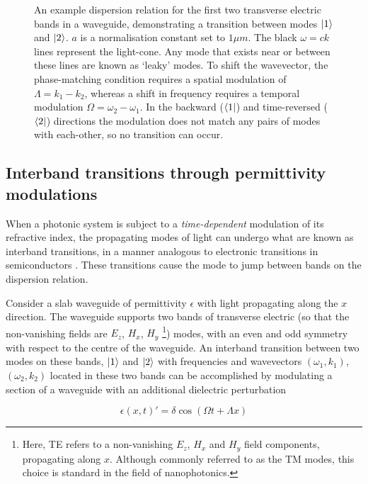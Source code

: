\begin{figure}[t]
	\centering
	\setlength{\figH}{\textwidth}
	\setlength{\figW}{\textwidth}
	
	\caption[Dispersion relation for the first two transverse electric bands in a waveguide]{An example dispersion relation for the first two transverse electric bands in a waveguide, demonstrating a transition between modes $\ket{1}$ and $\ket{2}$. $a$ is a normalisation constant set to $1 \mu m$. The black $\omega = ck$ lines represent the light-cone. Any mode that exists near or between these lines are known as `leaky' modes. To shift the wavevector, the phase-matching condition requires a spatial modulation of $\Lambda = k_1 - k_2$, whereas a shift in frequency requires a temporal modulation $\Omega = \omega_2-\omega_1$. In the backward ($\bra{1}$) and time-reversed ($\bra{2}$) directions the modulation does not match any pairs of modes with each-other, so no transition can occur.}
	\label{fig:bandsample}
\end{figure} 

\subsection{Interband transitions through permittivity modulations}
When a photonic system is subject to a \textit{time-dependent} modulation of its refractive index, the propagating modes of light can undergo what are known as interband transitions, in a manner analogous to electronic transitions in semiconductors \cite{Winn1999}. These transitions cause the mode to jump between bands on the dispersion relation. 

Consider a slab waveguide of permittivity $\epsilon$ with light propagating along the $x$ direction. The waveguide supports two bands of transverse electric (so that the non-vanishing fields are $E_z$, $H_x$, $H_y$ \footnote{Here, TE refers to a non-vanishing $E_z$, $H_x$ and $H_y$ field components, propagating along $x$. Although commonly referred to as the TM modes, this choice is standard in the field of nanophotonics.}) modes, with an even and odd symmetry with respect to the centre of the waveguide. An interband transition between two modes on these bands, $\ket{1}$ and $\ket{2}$ with frequencies and wavevectors $(\omega_1,k_1)$, $(\omega_2, k_2)$ located in these two bands can be accomplished by modulating a section of a waveguide with an additional dielectric perturbation

\begin{equation}
\epsilon(x,t)' = \delta \cos(\Omega t + \Lambda x)
\end{equation}

